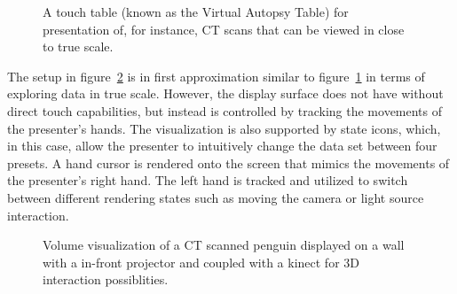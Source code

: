 \documentclass[review,journal]{vgtc}         %
\begin{document}
\begin{figure}[htb]
	\centering
	\caption{A touch table (known as the Virtual Autopsy Table) for presentation of, for instance, CT scans that can be viewed in close to true scale.}
	\label{img:exhibition_table}
\end{figure}

The setup in figure~\ref{img:exhibition_kinect} is in first approximation similar to figure~\ref{img:exhibition_table} in terms of exploring data in true scale.
However, the display surface does not have without direct touch capabilities, but instead is controlled by tracking the movements of the presenter's hands.
The visualization is also supported by state icons, which, in this case, allow the presenter to intuitively change the data set between four presets.
A hand cursor is rendered onto the screen that mimics the movements of the presenter's right hand.
The left hand is tracked and utilized to switch between different rendering states such as moving the camera or light source interaction.

\begin{figure}[htb]
	\centering
	\caption{Volume visualization of a CT scanned penguin displayed on a wall with a in-front projector and coupled with a kinect for 3D interaction possiblities.}
	\label{img:exhibition_kinect}
\end{figure}
\end{document}
